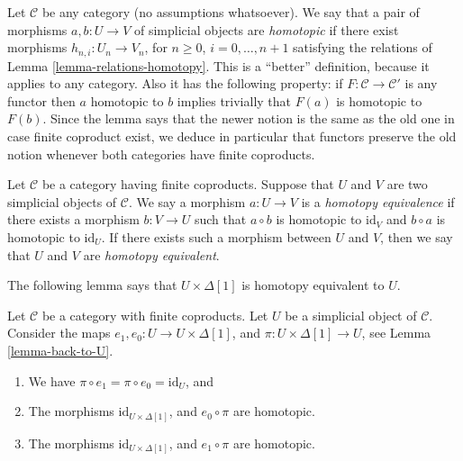 \begin{remark}
\label{remark-homotopy-better}
Let $\mathcal{C}$ be any category (no assumptions whatsoever).
We say that a pair of morphisms $a, b : U \to V$ of simplicial
objects  are {\it homotopic} if there
exist morphisms $h_{n, i} : U_n \to V_n$,
for $n \geq 0$, $i = 0, \ldots, n + 1$ satisfying the
relations of Lemma \ref{lemma-relations-homotopy}.
This is a ``better'' definition, because it applies to
any category. Also it has the following property: if
$F : \mathcal{C} \to \mathcal{C}'$ is any functor
then $a$ homotopic to $b$ implies trivially that
$F(a)$ is homotopic to $F(b)$.
Since the lemma says that the newer notion is the same
as the old one in case finite coproduct exist, we deduce
in particular that functors preserve the old notion
whenever both categories have finite coproducts.
\end{remark}

\begin{definition}
\label{definition-homotopy-equivalent}
Let $\mathcal{C}$ be a category having finite coproducts.
Suppose that $U$ and $V$ are two simplicial objects
of $\mathcal{C}$.
We say a morphism $a : U \to V$ is a {\it homotopy equivalence}
if there exists a morphism $b : V \to U$
such that $a \circ b$ is homotopic to $\text{id}_V$
and $b \circ a$ is homotopic to $\text{id}_U$.
If there exists such a morphism between $U$ and $V$, then
we say that $U$ and $V$ are {\it homotopy equivalent}.
\end{definition}

\noindent
The following lemma says that $U \times \Delta[1]$
is homotopy equivalent to $U$.

\begin{lemma}
\label{lemma-contractible}
Let $\mathcal{C}$ be a category with finite coproducts.
Let $U$ be a simplicial object of $\mathcal{C}$.
Consider the maps $e_1, e_0 : U \to U\times \Delta[1]$,
and $\pi : U\times \Delta[1] \to U$, see
Lemma \ref{lemma-back-to-U}.
\begin{enumerate}
\item We have $\pi \circ e_1 = \pi \circ e_0 = \text{id}_U$, and
\item The morphisms $\text{id}_{U \times \Delta[1]}$,
and $e_0 \circ \pi$ are homotopic.
\item The morphisms $\text{id}_{U \times \Delta[1]}$,
and $e_1 \circ \pi$ are homotopic.
\end{enumerate}
\end{lemma}

